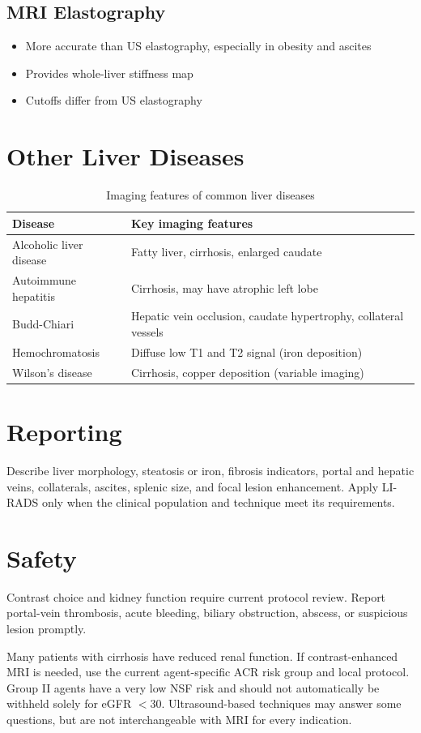 \subsection{MRI Elastography}
\begin{itemize}
  \item More accurate than US elastography, especially in obesity and ascites
  \item Provides whole-liver stiffness map
  \item Cutoffs differ from US elastography
\end{itemize}

\section{Other Liver Diseases}

\begin{table}[h]
\centering
\caption{Imaging features of common liver diseases}
\begin{tabular}{|p{}|p{}|}
\hline
\textbf{Disease} & \textbf{Key imaging features} \\
\hline
Alcoholic liver disease & Fatty liver, cirrhosis, enlarged caudate \\
Autoimmune hepatitis & Cirrhosis, may have atrophic left lobe \\
Budd-Chiari & Hepatic vein occlusion, caudate hypertrophy, collateral vessels \\
Hemochromatosis & Diffuse low T1 and T2 signal (iron deposition) \\
Wilson's disease & Cirrhosis, copper deposition (variable imaging) \\
\hline
\end{tabular}
\end{table}

\section{Reporting}
Describe liver morphology, steatosis or iron, fibrosis indicators, portal and hepatic veins, collaterals, ascites, splenic size, and focal lesion enhancement. Apply LI-RADS only when the clinical population and technique meet its requirements.

\section{Safety}
Contrast choice and kidney function require current protocol review. Report portal-vein thrombosis, acute bleeding, biliary obstruction, abscess, or suspicious lesion promptly.

\begin{pearlbox}
Many patients with cirrhosis have reduced renal function. If contrast-enhanced MRI is needed, use the current agent-specific ACR risk group and local protocol. Group II agents have a very low NSF risk and should not automatically be withheld solely for eGFR $<$30. Ultrasound-based techniques may answer some questions, but are not interchangeable with MRI for every indication.
\end{pearlbox}

\clearpage
